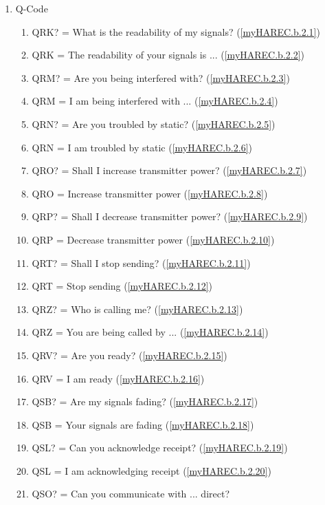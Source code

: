 \begin{enumerate}
\item Q-Code
\begin{enumerate}
\item QRK? = What is the readability of my signals?
  (\ref{myHAREC.b.2.1})\label{HAREC.b.2.1}
\item QRK  = The readability of your signals is ...
  (\ref{myHAREC.b.2.2})\label{HAREC.b.2.2}
\item QRM? = Are you being interfered with?
  (\ref{myHAREC.b.2.3})\label{HAREC.b.2.3}
\item QRM  = I am being interfered with ...
  (\ref{myHAREC.b.2.4})\label{HAREC.b.2.4}
\item QRN? = Are you troubled by static?
  (\ref{myHAREC.b.2.5})\label{HAREC.b.2.5}
\item QRN  = I am troubled by static
  (\ref{myHAREC.b.2.6})\label{HAREC.b.2.6}
\item QRO? = Shall I increase transmitter power?
  (\ref{myHAREC.b.2.7})\label{HAREC.b.2.7}
\item QRO  = Increase transmitter power
  (\ref{myHAREC.b.2.8})\label{HAREC.b.2.8}
\item QRP? = Shall I decrease transmitter power?
  (\ref{myHAREC.b.2.9})\label{HAREC.b.2.9}
\item QRP  = Decrease transmitter power
  (\ref{myHAREC.b.2.10})\label{HAREC.b.2.10}
\item QRT? = Shall I stop sending?
  (\ref{myHAREC.b.2.11})\label{HAREC.b.2.11}
\item QRT  = Stop sending
  (\ref{myHAREC.b.2.12})\label{HAREC.b.2.12}
\item QRZ? = Who is calling me?
  (\ref{myHAREC.b.2.13})\label{HAREC.b.2.13}
\item QRZ  = You are being called by ...
  (\ref{myHAREC.b.2.14})\label{HAREC.b.2.14}
\item QRV? = Are you ready?
  (\ref{myHAREC.b.2.15})\label{HAREC.b.2.15}
\item QRV  = I am ready
  (\ref{myHAREC.b.2.16})\label{HAREC.b.2.16}
\item QSB? = Are my signals fading?
  (\ref{myHAREC.b.2.17})\label{HAREC.b.2.17}
\item QSB  = Your signals are fading
  (\ref{myHAREC.b.2.18})\label{HAREC.b.2.18}
\item QSL? = Can you acknowledge receipt?
  (\ref{myHAREC.b.2.19})\label{HAREC.b.2.19}
\item QSL  = I am acknowledging receipt
  (\ref{myHAREC.b.2.20})\label{HAREC.b.2.20}
\item QSO? = Can you communicate with ... direct?

\end{enumerate}
\end{enumerate}

